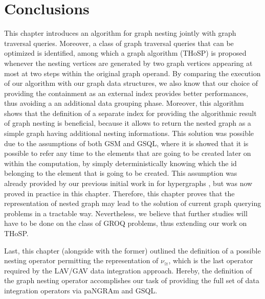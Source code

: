 \section{Conclusions}
This chapter introduces an algorithm for graph nesting jointly with graph traversal queries. Moreover, a class of graph traversal queries that can be optimized is identified, among which a graph algorithm (THoSP) is proposed whenever the nesting vertices are generated by two graph vertices appearing at most at two steps within the original graph operand. By comparing the execution of our algorithm with our graph data structures, we also know that our choice of providing the containment as an external index provides better performances, thus avoiding a an additional data grouping phase. Moreover, this algorithm shows that the definition of a separate index for providing the algorithmic result of graph nesting is beneficial, because it allows to return the nested graph as a simple graph having additional nesting informations. This solution was possible due to the assumptions of both GSM and GSQL, where it is showed that it is possible to refer any time to the elements that are going to be created later on within the computation, by simply deterministically knowing which the id belonging to the element that is going to be created. This assumption was already provided by our previous initial work in for hypergraphs \cite{bergami2014}, but was now proved in practice in this chapter. Therefore, this chapter proves that the representation of nested graph may lead to the solution of current graph querying problems in a tractable way. Nevertheless, we believe that further studies will have to be done on the class of  GROQ problems, thus extending our work on THoSP.

Last, this chapter (alongside with the former) outlined the definition of a possible nesting operator permitting the representation of $\nu_\cong$, which is the last operator required by the LAV/GAV data integration approach. Hereby, the definition of the graph nesting operator accomplishes our task of providing the full set of data integration operators via paNGRAm and GSQL.
